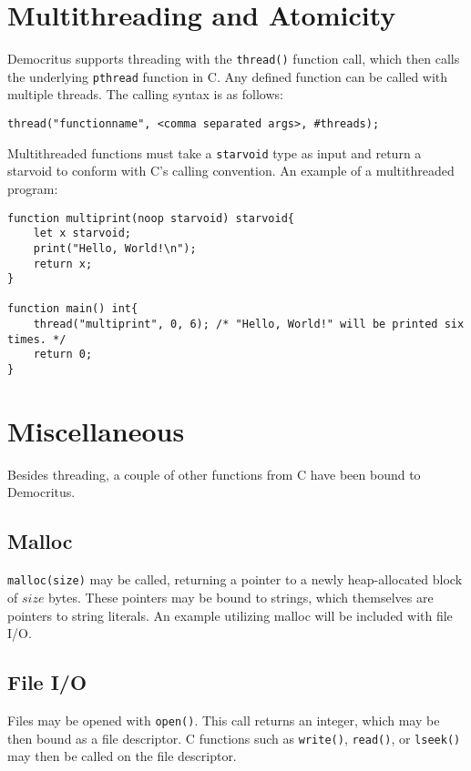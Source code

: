 \section{Multithreading and Atomicity}
	Democritus supports threading with the \texttt{thread()} function call, which then calls the underlying \texttt{pthread} function in C. Any defined function can be called with multiple threads. The calling syntax is as follows:
	\begin{lstlisting}
thread("functionname", <comma separated args>, #threads);
	\end{lstlisting}

	\noindent
	Multithreaded functions must take a \texttt{starvoid} type as input and return a starvoid to conform with C's calling convention. An example of a multithreaded program:

	\begin{lstlisting}
function multiprint(noop starvoid) starvoid{
	let x starvoid;
	print("Hello, World!\n");
	return x;
}

function main() int{
	thread("multiprint", 0, 6); /* "Hello, World!" will be printed six times. */
	return 0;
}

	\end{lstlisting}



\section{Miscellaneous}
	Besides threading, a couple of other functions from C have been bound to Democritus.

	\subsection{Malloc}
		\texttt{malloc(size)} may be called, returning a pointer to a newly heap-allocated block of $size$ bytes. These pointers may be bound to strings, which themselves are pointers to string literals. An example utilizing malloc will be included with file I/O.

	\subsection{File I/O}
		Files may be opened with \texttt{open()}. This call returns an integer, which may be then bound as a file descriptor. C functions such as \texttt{write()}, \texttt{read()}, or \texttt{lseek()} may then be called on the file descriptor. 

